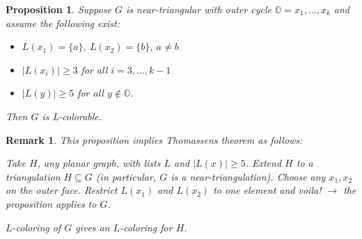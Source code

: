 \documentclass[a4paper]{article}
\theoremstyle{plain}
\newtheorem{proposition}[lemma]{Proposition}
\theoremstyle{myremark}
\newtheorem{remark}[lemma]{Remark}
\begin{document}
\begin{proposition}
Suppose $G$ is near-triangular with outer cycle $\mathbb{O}=x_1,\ldots,x_k$ and assume the following exist:
\begin{itemize}
\item $L(x_1)=\{a\}$, $L(x_2)=\{b\}$, $a\neq b$
\item $|L(x_i)|\geq 3$ for all $i=3,\ldots,k-1$
\item $|L(y)|\geq 5$ for all $y\notin \mathbb{O}$.
\end{itemize}
Then $G$ is L-colorable.
\end{proposition}

\begin{remark}
This proposition implies Thomassens theorem as follows:

Take $H$, any planar graph, with lists $L$ and $|L(x)| \geq 5$. Extend $H$ to a triangulation $H\subseteq G$ (in particular, $G$ is a near-triangulation). Choose any $x_1,x_2$ on the outer face. Restrict $L(x_1)$ and $L(x_2)$ to one element and voila! $\rightarrow$ the proposition applies to $G$. 

$L$-coloring of $G$ gives an $L$-coloring for $H$.
\end{remark}
\end{document}
